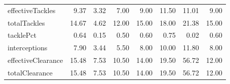 \begin{table}[H]
\begin{tabular}{lrrrrrrr}
effectiveTackles & 9.37 & 3.32 & 7.00 & 9.00 & 11.50 & 11.01 & 9.00 \\
totalTackles & 14.67 & 4.62 & 12.00 & 15.00 & 18.00 & 21.38 & 15.00 \\
tacklePct & 0.64 & 0.15 & 0.50 & 0.60 & 0.75 & 0.02 & 0.60 \\
interceptions & 7.90 & 3.44 & 5.50 & 8.00 & 10.00 & 11.80 & 8.00 \\
effectiveClearance & 15.48 & 7.53 & 10.50 & 14.00 & 19.50 & 56.72 & 12.00 \\
totalClearance & 15.48 & 7.53 & 10.50 & 14.00 & 19.50 & 56.72 & 12.00 \\
\hline
\end{tabular}
\end{table}
